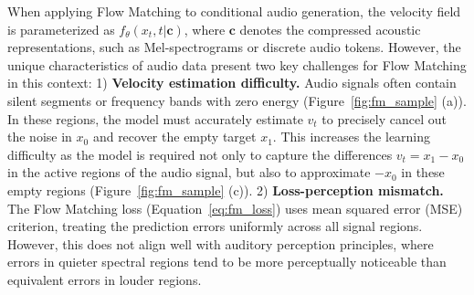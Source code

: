 When applying Flow Matching to conditional audio generation, the velocity field is parameterized as $f_{\theta}(x_t, t|\mathbf{c})$, where $\mathbf{c}$ denotes the compressed acoustic representations, such as Mel-spectrograms or discrete audio tokens. 
However, the unique characteristics of audio data present two key challenges for Flow Matching in this context: 1) \textbf{Velocity estimation difficulty.} Audio signals often contain silent segments or frequency bands with zero energy (Figure~\ref{fig:fm_sample} (a)). In these regions, the model must accurately estimate $v_t$ to precisely cancel out the noise in $x_0$ and recover the empty target $x_1$. This increases the learning difficulty as the model is required not only to capture the differences $v_t = x_1 - x_0$ in the active regions of the audio signal, but also to approximate $-x_0$ in these empty regions (Figure~\ref{fig:fm_sample} (c)). 
2) \textbf{Loss-perception mismatch.} The Flow Matching loss (Equation~\ref{eq:fm_loss}) uses mean squared error (MSE) criterion, treating the prediction errors uniformly across all signal regions. However, this does not align well with auditory perception principles, where errors in quieter spectral regions tend to be more perceptually noticeable than equivalent errors in louder regions. 

